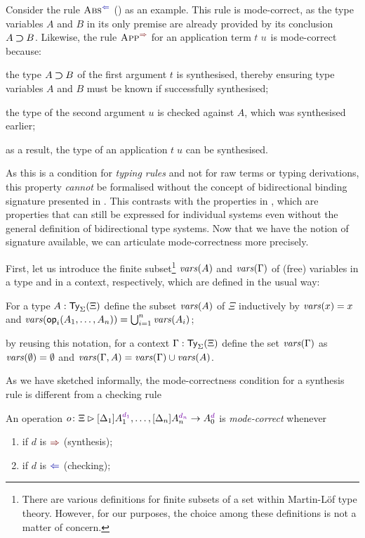 Consider the rule $\ChkRule{Abs}$ () as an example.
This rule is mode-correct, as the type variables $A$ and $B$ in its only premise are already provided by its conclusion $A \mathbin{\bm{\supset}} B$.
Likewise, the rule $\SynRule{App}$ for an application term $\isTerm{t\;u}$ is mode-correct because:
\begin{enumerate*}
\item the type $A \mathbin{\bm{\supset}} B$ of the first argument $t$ is synthesised, thereby ensuring type variables $A$ and $B$ must be known if successfully synthesised;
\item the type of the second argument $u$ is checked against $A$, which was synthesised earlier;
\item as a result, the type of an application $t\;u$ can be synthesised.
\end{enumerate*}

As this is a condition for \emph{typing rules} and not for raw terms or typing derivations, this property \emph{cannot} be formalised without the concept of bidirectional binding signature presented in .
This contrasts with the properties in , which are properties that can still be expressed for individual systems even without the general definition of bidirectional type systems.
Now that we have the notion of signature available, we can articulate mode-correctness more precisely.

First, let us introduce the finite subset\footnote{%
  There are various definitions for finite subsets of a set within Martin-L\"{o}f type theory.
  However, for our purposes, the choice among these definitions is not a matter of concern.
}
$\mathit{vars}(A)$ and $\mathit{vars}(\Gamma)$ of (free) variables in a type and in a context, respectively, which are defined in the usual way:
\begin{enumerate*}
\item For a type $A : \mathsf{Ty}_{\Sigma}(\Xi)$ define the subset $\mathit{vars}(A)$ of $\Xi$ inductively by $\mathit{vars}(x) = {x}$ and $\mathit{vars}(\mathsf{op}_{i}(A_1, \ldots, A_n)) = \bigcup_{i = 1}^{n} \mathit{vars}(A_i)$;
\item by reusing this notation, for a context $\Gamma : \mathsf{Ty}_{\Sigma}(\Xi)$ define the set $\mathit{vars}(\Gamma)$ as $\mathit{vars}(\emptyset) = \emptyset$ and $\mathit{vars}(\Gamma, A) = \mathit{vars}(\Gamma) \cup \mathit{vars}(A)$.
\end{enumerate*}
As we have sketched informally, the mode-correctness condition for a synthesis rule is different from a checking rule
\begin{definition} \label{def:mode-correctness}
  An operation $\aritysymbol{o}{\Xi}{[\Delta_1]A_{1}^{\dir{d_1}}, \ldots, [\Delta_{n}] A_{n}^{\dir{d_n}}}{A_0^{\dir{d}}}$ is \emph{mode-correct} whenever
  \begin{enumerate}
    \item if $d$ is $\syn$ (synthesis);
    \item if $d$ is $\chk$ (checking);
  \end{enumerate}
  
\end{definition}


